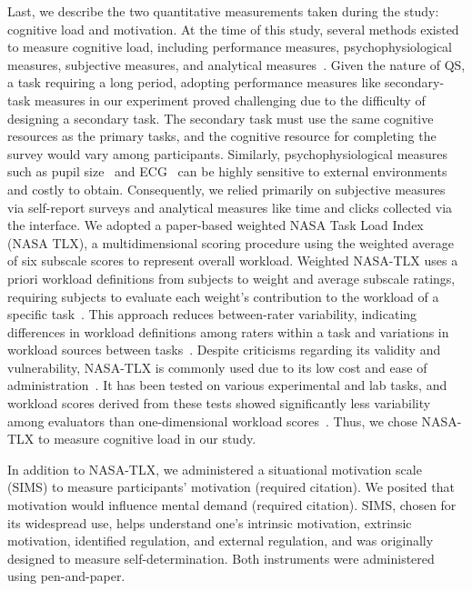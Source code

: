 Last, we describe the two quantitative measurements taken during the study: cognitive load and motivation. At the time of this study, several methods existed to measure cognitive load, including performance measures, psychophysiological measures, subjective measures, and analytical measures~\cite{gaoMentalWorkloadMeasurement2013}. Given the nature of QS, a task requiring a long period, adopting performance measures like secondary-task measures in our experiment proved challenging due to the difficulty of designing a secondary task. The secondary task must use the same cognitive resources as the primary tasks, and the cognitive resource for completing the survey would vary among participants. Similarly, psychophysiological measures such as pupil size~\cite{palinkoEstimatingCognitiveLoad2010} and ECG~\cite{haapalainenPsychophysiologicalMeasuresAssessing2010} can be highly sensitive to external environments and costly to obtain. Consequently, we relied primarily on subjective measures via self-report surveys and analytical measures like time and clicks collected via the interface. We adopted a paper-based weighted NASA Task Load Index (NASA TLX), a multidimensional scoring procedure using the weighted average of six subscale scores to represent overall workload. Weighted NASA-TLX uses a priori workload definitions from subjects to weight and average subscale ratings, requiring subjects to evaluate each weight's contribution to the workload of a specific task~\cite{hart1988development, hartNasaTaskLoadIndex2006, cain2007review}. This approach reduces between-rater variability, indicating differences in workload definitions among raters within a task and variations in workload sources between tasks~\cite{cain2007review}. Despite criticisms regarding its validity and vulnerability, NASA-TLX is commonly used due to its low cost and ease of administration~\cite{gaoMentalWorkloadMeasurement2013}. It has been tested on various experimental and lab tasks, and workload scores derived from these tests showed significantly less variability among evaluators than one-dimensional workload scores~\cite{rubioEvaluationSubjectiveMental2004}. Thus, we chose NASA-TLX to measure cognitive load in our study.

In addition to NASA-TLX, we administered a situational motivation scale (SIMS) to measure participants' motivation (required citation). We posited that motivation would influence mental demand (required citation). SIMS, chosen for its widespread use, helps understand one's intrinsic motivation, extrinsic motivation, identified regulation, and external regulation, and was originally designed to measure self-determination. Both instruments were administered using pen-and-paper.